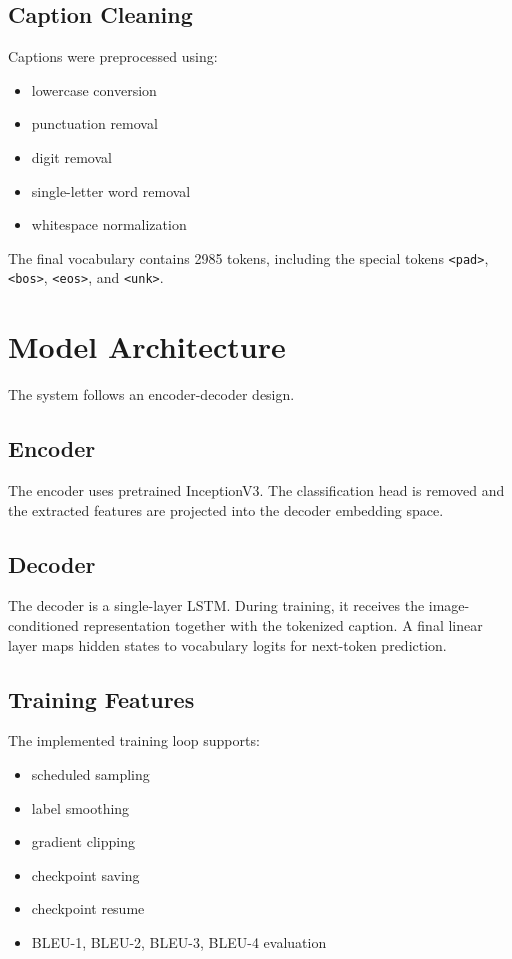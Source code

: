 \documentclass[11pt,a4paper]{article}
\begin{document}
\subsection{Caption Cleaning}

Captions were preprocessed using:
\begin{itemize}[leftmargin=*]
    \item lowercase conversion
    \item punctuation removal
    \item digit removal
    \item single-letter word removal
    \item whitespace normalization
\end{itemize}

The final vocabulary contains 2985 tokens, including the special tokens \texttt{<pad>}, \texttt{<bos>}, \texttt{<eos>}, and \texttt{<unk>}.

\section{Model Architecture}

The system follows an encoder-decoder design.

\subsection{Encoder}

The encoder uses pretrained InceptionV3. The classification head is removed and the extracted features are projected into the decoder embedding space.

\subsection{Decoder}

The decoder is a single-layer LSTM. During training, it receives the image-conditioned representation together with the tokenized caption. A final linear layer maps hidden states to vocabulary logits for next-token prediction.

\subsection{Training Features}

The implemented training loop supports:
\begin{itemize}[leftmargin=*]
    \item scheduled sampling
    \item label smoothing
    \item gradient clipping
    \item checkpoint saving
    \item checkpoint resume
    \item BLEU-1, BLEU-2, BLEU-3, BLEU-4 evaluation
\end{itemize}
\end{document}
